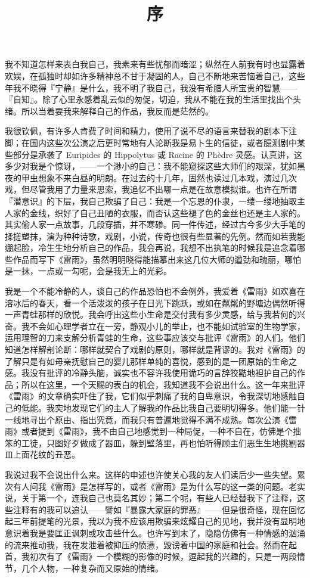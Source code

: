 \title{序}

我不知道怎样来表白我自己，我素来有些忧郁而暗涩；纵然在人前我有时也显露着欢娱，在孤独时却如许多精神总不甘于凝固的人，自己不断地来苦恼着自己，这些年我不晓得『宁静』是什么，我不明了我自己，我没有希腊人所宝贵的智慧——『自知』。除了心里永感着乱云似的匆促，切迫，我从不能在我的生活里找出个头绪。所以当着要我来解释自己的作品，我反而是茫然的。

我很钦佩，有许多人肯费了时间和精力，使用了说不尽的语言来替我的剧本下注脚；在国内这些次公演之后更时常地有人论断我是易卜生的信徒，或者臆测剧中某些部分是承袭了 Euripides 的 Hippolytus 或 Racine 的 Phèdre 灵感。认真讲，这多少对我是个惊讶，——一个渺小的自己：我不能窥探这些大师们的艰深，犹如黑夜的甲虫想象不来白昼的明朗。在过去的十几年，固然也读过几本戏，演过几次戏，但尽管我用了力量来思索，我追忆不出哪一点是在故意模拟谁。也许在所谓『潜意识』的下层，我自己欺骗了自己：我是一个忘恩的仆隶，一缕一缕地抽取主人家的金线，织好了自己丑陋的衣服，而否认这些褪了色的金丝也还是主人家的。其实偷人家一点故事，几段穿插，并不寒碜。同一件传述，经过古今多少大手笔的揉搓塑抹，演为种种诗歌，戏剧，小说，传奇也很有些显著的先例。然而如若我能绷起脸，冷生生地分析自己的作品，我会再说，我想不出执笔的时候我是追念着哪些作品而写下《雷雨》，虽然明明晓得能描摹出来这几位大师的遒劲和瑰丽，哪怕是一抹，一点或一勾呢，会是我无上的光彩。

我是一个不能冷静的人，谈自己的作品恐怕也不会例外，我爱着《雷雨》如欢喜在溶冰后的春天，看一个活泼泼的孩子在日光下跳跃，或如在粼粼的野塘边偶然听得一声青蛙那样的欣悦。我会呼出这些小生命是交付我有多少灵感，给与我若何的兴奋。我不会如心理学者立在一旁，静观小儿的举止，也不能如试验室的生物学家，运用理智的刀来支解分析青蛙的生命，这些事应该交与批评《雷雨》的人们。他们知道怎样解剖论断：哪样就契合了戏剧的原则，哪样就是背谬的。我对《雷雨》的了解只是有如母亲抚慰自己的婴儿那样单纯的喜悦，感到的是一团原始的生命之感。我没有批评的冷静头脑，诚实也不容许我使用诡巧的言辞狡黠地袒护自己的作品；所以在这里，一个天赐的表白的机会，我知道我不会说出什么。这一年来批评《雷雨》的文章确实吓住了我，它们似乎刺痛了我的自卑意识，令我深切地感触自己的低能。我突地发现它们的主人了解我的作品比我自己要明切得多。他们能一针一线地寻出个原由、指出究竟，而我只有普遍地觉得不满不成熟。每次公演《雷雨》或者提到《雷雨》，我不由自己地感觉到一种局促，一种不自在，仿佛是个拙笨的工徒，只图好歹做成了器皿，躲到壁落里，再也怕听得顾主们恶生生地挑剔器皿上面花纹的丑恶。

我说过我不会说出什么来。这样的申述也许使关心我的友人们读后少一些失望。累次有人问我《雷雨》是怎样写的，或者《雷雨》是为什么写的这一类的问题。老实说，关于第一个，连我自己也莫名其妙；第二个呢，有些人已经替我下了注释，这些注释有的我可以追认——譬如『暴露大家庭的罪恶』——但是很奇怪，现在回忆起三年前提笔的光景，我以为我不应该用欺骗来炫耀自己的见地，我并没有显明地意识着我是要匡正讽刺或攻击些什么。也许写到末了，隐隐仿佛有一种情感的汹涌的流来推动我，我在发泄着被抑压的愤懑，毁谤着中国的家庭和社会。然而在起首，我初次有了《雷雨》一个模糊的影像的时候，逗起我的兴趣的，只是一两段情节，几个人物，一种复杂而又原始的情绪。

